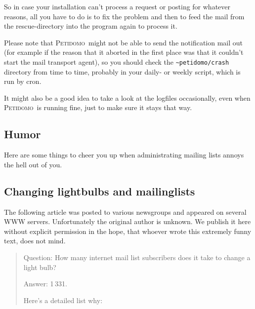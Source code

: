 \documentclass[a4paper]{report}
\newcommand{\Petidomo}{{\scshape Peti\-domo}}
\newcommand{\file}[1]{{\tt #1}}
\begin{document}
So in case your installation can't process a request or posting for
whatever reasons, all you have to do is to fix the problem and then to
feed the mail from the rescue-directory into the program again to
process it.

Please note that \Petidomo\ might not be able to send the notification
mail out (for example if the reason that it aborted in the first place
was that it couldn't start the mail transport agent), so you should
check the \file{\~{}petidomo/crash} directory from time to time,
probably in your daily- or weekly script, which is run by cron.

It might also be a good idea to take a look at the logfiles
occasionally, even when \Petidomo\ is running fine, just to make sure
it stays that way.


%
\begin{appendix}
\chapter{Humor}

Here are some things to cheer you up when administrating
mailing lists annoys the hell out of you.

\section{Changing lightbulbs and mailinglists}

The following article was posted to various newsgroups and appeared on
several WWW servers. Unfortunately the original author is unknown. We
publish it here without explicit permission in the hope, that whoever
wrote this extremely funny text, does not mind.

\bigskip

\begin{quotation}

\noindent
Question: How many internet mail list subscribers does it take to
change a light bulb?

\noindent
Answer: 1\,331.

\noindent
Here's a detailed list why:


\end{quotation}
\end{appendix}
\end{document}
